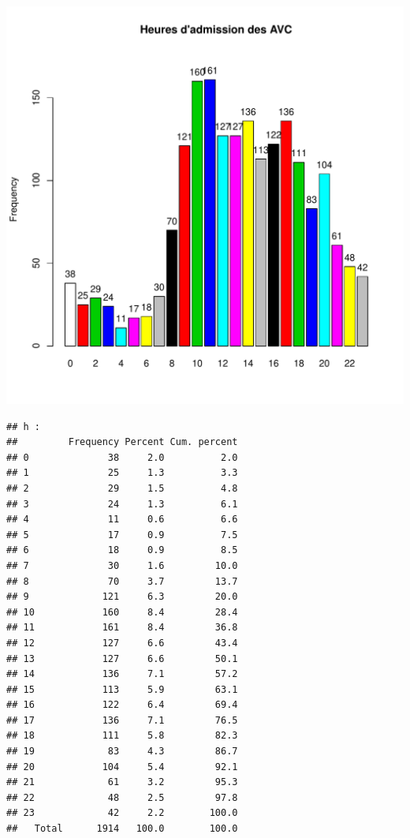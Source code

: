 \documentclass[12pt,english,french,twoside]{report}\usepackage[]{graphicx}\usepackage[]{color}
\makeatletter
\def\maxwidth{ %
  \ifdim\Gin@nat@width>\linewidth
    \linewidth
  \else
    \Gin@nat@width
  \fi
}
\newenvironment{kframe}{%
 \def\at@end@of@kframe{}%
 \ifinner\ifhmode%
  \def\at@end@of@kframe{\end{minipage}}%
  \begin{minipage}{\columnwidth}%
 \fi\fi%
 \def\FrameCommand##1{\hskip\@totalleftmargin \hskip-\fboxsep
 \colorbox{shadecolor}{##1}\hskip-\fboxsep
     \hskip-\linewidth \hskip-\@totalleftmargin \hskip\columnwidth}%
 \MakeFramed {\advance\hsize-\width
   \@totalleftmargin\z@ \linewidth\hsize
   \@setminipage}}%
 {\par\unskip\endMakeFramed%
 \at@end@of@kframe}
\newenvironment{knitrout}{}{} %
\makeatother
\begin{document}
\begin{knitrout}
\includegraphics[width=\maxwidth]{figure/heure_avc2} 
\begin{kframe}\begin{verbatim}
## h :  
##         Frequency Percent Cum. percent
## 0              38     2.0          2.0
## 1              25     1.3          3.3
## 2              29     1.5          4.8
## 3              24     1.3          6.1
## 4              11     0.6          6.6
## 5              17     0.9          7.5
## 6              18     0.9          8.5
## 7              30     1.6         10.0
## 8              70     3.7         13.7
## 9             121     6.3         20.0
## 10            160     8.4         28.4
## 11            161     8.4         36.8
## 12            127     6.6         43.4
## 13            127     6.6         50.1
## 14            136     7.1         57.2
## 15            113     5.9         63.1
## 16            122     6.4         69.4
## 17            136     7.1         76.5
## 18            111     5.8         82.3
## 19             83     4.3         86.7
## 20            104     5.4         92.1
## 21             61     3.2         95.3
## 22             48     2.5         97.8
## 23             42     2.2        100.0
##   Total      1914   100.0        100.0
\end{verbatim}
\end{kframe}
\end{knitrout}
\end{document}
